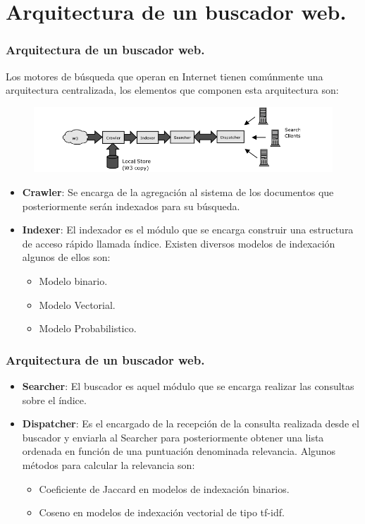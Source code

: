 \documentclass[9pt]{beamer} %
\begin{document}
\section{Arquitectura de un buscador web.}
\begin{frame}
	\frametitle{Arquitectura de un buscador web.}
Los motores de búsqueda que operan en Internet tienen comúnmente una arquitectura centralizada, los elementos que componen esta arquitectura son:
		\begin{figure}[H]
			\centering
			\includegraphics[scale=0.6]{./img/modeloreferente.png}
		\end{figure}
		\begin{itemize}
			\item \textbf{Crawler}: Se encarga de la agregación al sistema de los documentos que posteriormente serán indexados para su búsqueda.
			\item \textbf{Indexer}: El indexador es el módulo que se encarga construir una estructura de acceso rápido llamada índice.
			Existen diversos modelos de indexación algunos de ellos son:
			\begin{itemize}
				\item Modelo binario.
				\item Modelo Vectorial.
				\item Modelo Probabilistico.
			\end{itemize}

		\end{itemize}
\end{frame}

\begin{frame}
	\frametitle{Arquitectura de un buscador web.}

	\begin{itemize}
		\item \textbf{Searcher}: El buscador es aquel módulo que se encarga realizar las consultas sobre el índice.
		\item \textbf{Dispatcher}: Es el encargado de la recepción de la consulta realizada desde el buscador y enviarla al Searcher para posteriormente obtener una lista ordenada en función de una puntuación denominada relevancia. Algunos métodos para calcular la relevancia son:
		\begin{itemize}
			\item Coeficiente de Jaccard en modelos de indexación binarios.
			\item Coseno en modelos de indexación vectorial de tipo tf-idf.
		\end{itemize}


	\end{itemize}
\end{frame}
\end{document}
